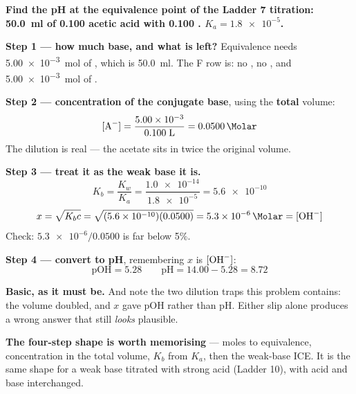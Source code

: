\documentclass{apchem-worksheet}
\begin{document}
\begin{workedexample}
\textbf{Find the pH at the equivalence point of the Ladder 7 titration:
\SI{50.0}{\milli\litre} of \SI{0.100}{\Molar} acetic acid with
\SI{0.100}{\Molar} . $K_{a} = \num{1.8e-5}$.}

\textbf{Step 1 --- how much base, and what is left?} Equivalence needs
\SI{5.00e-3}{\mole} of , which is
\SI{50.0}{\milli\litre}. The F row is: no , no , and
\SI{5.00e-3}{\mole} of .

\textbf{Step 2 --- concentration of the conjugate base}, using the
\textbf{total} volume:
\[ [\ce{A-}] = \frac{\num{5.00e-3}}{0.100\;\si{\litre}}
   = \SI{0.0500}{\Molar} \]
The dilution is real --- the acetate sits in twice the original volume.

\textbf{Step 3 --- treat it as the weak base it is.}
\[ K_{b} = \frac{K_{w}}{K_{a}}
   = \frac{\num{1.0e-14}}{\num{1.8e-5}} = \num{5.6e-10} \]
\[ x = \sqrt{K_{b}c} = \sqrt{(\num{5.6e-10})(0.0500)}
     = \SI{5.3e-6}{\Molar} = [\ce{OH-}] \]
Check: $\num{5.3e-6}/0.0500$ is far below 5\%. \checkmark

\textbf{Step 4 --- convert to pH}, remembering $x$ is $[\ce{OH-}]$:
\[ \text{pOH} = 5.28
   \qquad
   \text{pH} = 14.00 - 5.28 = \mathbf{8.72} \]

\textbf{Basic, as it must be.} And note the two dilution traps this
problem contains: the volume doubled, and $x$ gave pOH rather than pH.
Either slip alone produces a wrong answer that still \emph{looks}
plausible.

\textbf{The four-step shape is worth memorising} --- moles to
equivalence, concentration in the total volume, $K_{b}$ from $K_{a}$,
then the weak-base ICE. It is the same shape for a weak base titrated
with strong acid (Ladder 10), with acid and base interchanged.
\end{workedexample}
\end{document}
